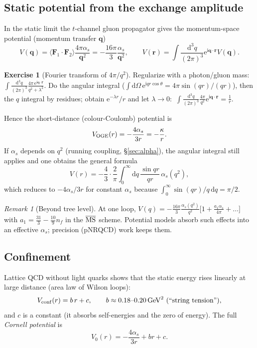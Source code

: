 \documentclass[11pt,a4paper]{article}
\numberwithin{equation}{section}
\theoremstyle{definition}
\newtheorem{exercise}[definition]{Exercise}
\theoremstyle{plain}
\theoremstyle{remark}
\newtheorem{remark}[definition]{Remark}
\numberwithin{algorithm}{section}
\newcommand{\vr}{\bm r}
\newcommand{\vq}{\bm q}
\newcommand{\vF}{\bm F}
\newcommand{\as}{\alpha_s}
\newcommand{\dd}{\mathrm{d}}
\newcommand{\ii}{\mathrm{i}}
\newcommand{\ee}{\mathrm{e}}
\newcommand{\GeV}{\,\mathrm{GeV}}
\begin{document}
\subsection{Static potential from the exchange amplitude}\label{sec:static}
In the static limit the $t$-channel gluon propagator gives the momentum-space potential (momentum transfer $\vq$)
\begin{equation}
V(\vq)=\langle\vF_1\!\cdot\!\vF_2\rangle\frac{4\pi\as}{\vq^2}=-\frac{16\pi}{3}\frac{\as}{\vq^2},\qquad
V(\vr)=\int\frac{\dd^3q}{(2\pi)^3}\ee^{\ii\vq\cdot\vr}V(\vq).
\end{equation}

\begin{exercise}[Fourier transform of $4\pi/q^2$]
Regularize with a photon/gluon mass: $\int\frac{\dd^3q}{(2\pi)^3}\frac{4\pi\,\ee^{\ii\vq\cdot\vr}}{q^2+\lambda^2}$. Do the angular integral ($\int\dd\Omega\,\ee^{\ii qr\cos\theta}=4\pi\sin(qr)/(qr)$), then the $q$ integral by residues; obtain $\ee^{-\lambda r}/r$ and let $\lambda\to0$: $\ \int\frac{\dd^3q}{(2\pi)^3}\frac{4\pi}{q^2}\ee^{\ii\vq\cdot\vr}=\frac1r$.
\end{exercise}
Hence the short-distance (colour-Coulomb) potential is
\begin{equation}
V_{\rm OGE}(r)=-\frac{4\as}{3r}=-\frac{\kappa}{r}.
\end{equation}
If $\as$ depends on $q^2$ (running coupling, \S\ref{sec:alpha}), the angular integral still applies and one obtains the general formula
\begin{equation}
V(r)=-\frac43\cdot\frac2\pi\int_0^\infty\dd q\,\frac{\sin qr}{qr}\,\as(q^2),
\label{eq:FTalpha}
\end{equation}
which reduces to $-4\as/3r$ for constant $\as$ because $\int_0^\infty\sin(qr)/q\,\dd q=\pi/2$.

\begin{remark}[Beyond tree level]
At one loop, $V(q)=-\frac{16\pi}{3}\frac{\as(q^2)}{q^2}\big[1+\frac{a_1\as}{4\pi}+\dots\big]$ with $a_1=\frac{31}{3}-\frac{10}{9}n_f$ in the $\overline{\rm MS}$ scheme. Potential models absorb such effects into an effective $\as$; precision (pNRQCD) work keeps them.
\end{remark}

\subsection{Confinement}\label{sec:conf}
Lattice QCD without light quarks shows that the static energy rises linearly at large distance (area law of Wilson loops):
\begin{equation}
V_{\rm conf}(r)=b\,r+c,\qquad b\approx0.18\text{--}0.20\GeV^2\ (\text{``string tension''}),
\end{equation}
and $c$ is a constant (it absorbs self-energies and the zero of energy). The full \emph{Cornell potential} is
\begin{equation}
V_0(r)=-\frac{4\as}{3r}+br+c .
\end{equation}
\end{document}
